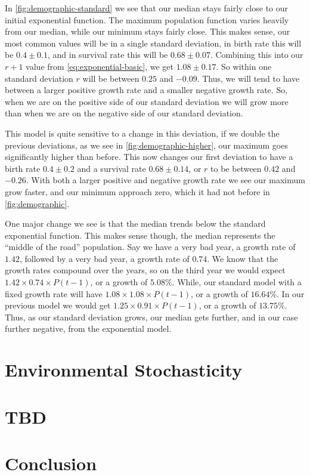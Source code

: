 \documentclass{article}
\begin{document}
In \cref{fig:demographic-standard} we see that our median stays fairly close to our initial exponential function. The maximum population function varies heavily from our median, while our minimum stays fairly close. This makes sense, our most common values will be in a single standard deviation, in birth rate this will be $0.4 \pm 0.1$, and in survival rate this will be $0.68 \pm 0.07$. Combining this into our $r + 1$ value from \cref{eq:exponential-basic}, we get $1.08 \pm 0.17$. So within one standard deviation $r$ will be between $0.25$ and $-0.09$. Thus, we will tend to have between a larger positive growth rate and a smaller negative growth rate. So, when we are on the positive side of our standard deviation we will grow more than when we are on the negative side of our standard deviation.

This model is quite sensitive to a change in this deviation, if we double the previous deviations, as we see in \cref{fig:demographic-higher}, our maximum goes significantly higher than before. This now changes our first deviation to have a birth rate $0.4 \pm 0.2$ and a survival rate $0.68 \pm 0.14$, or $r$ to be between $0.42$ and $-0.26$. With both a larger positive and negative growth rate we see our maximum grow faster, and our minimum approach zero, which it had not before in \cref{fig:demographic}.

One major change we see is that the median trends below the standard exponential function. This makes sense though, the median represents the ``middle of the road'' population. Say we have a very bad year, a growth rate of $1.42$, followed by a very bad year, a growth rate of $0.74$. We know that the growth rates compound over the years, so on the third year we would expect $1.42 \times 0.74 \times P(t-1)$, or a growth of $5.08\%$. While, our standard model with a fixed growth rate will have $1.08 \times 1.08 \times P(t-1)$, or a growth of $16.64\%$. In our previous model we would get $1.25 \times 0.91 \times P(t-1)$, or a growth of $13.75\%$. Thus, as our standard deviation grows, our median gets further, and in our case further negative, from the exponential model.


\section{Environmental Stochasticity}

\section{TBD}

\section{Conclusion}
\end{document}
